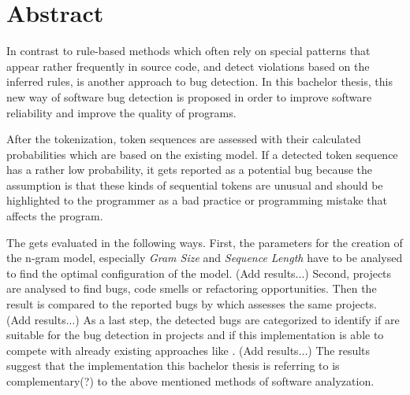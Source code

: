 \chapter*{Abstract}

In contrast to rule-based methods which often rely on special patterns that appear rather frequently in source code, and detect violations based on the inferred rules, \ngram{} is another approach to bug detection. In this bachelor thesis, this new way of software bug detection is proposed in order to improve software reliability and improve the quality of \scratch{} programs.

After the tokenization, token sequences are assessed with their calculated probabilities which are based on the existing model. If a detected token sequence has a rather low probability, it gets reported as a potential bug because the assumption is that these kinds of sequential tokens are unusual and should be highlighted to the programmer as a bad practice or programming mistake that affects the program.

The \ngram{} gets evaluated in the following ways. First, the parameters for the creation of the n-gram model, especially \emph{Gram Size} and \emph{Sequence Length} have to be analysed to find the optimal configuration of the model. (Add results...) Second, \scratch{} projects are analysed to find bugs, code smells or refactoring opportunities. Then the result is compared to the reported bugs by \litterbox{} which assesses the same projects. (Add results...) As a last step, the detected bugs are categorized to identify if  are suitable for the bug detection in \scratch{} projects and if this implementation is able to compete with already existing approaches like \litterbox{}. (Add results...) The results suggest that the implementation this bachelor thesis is referring to is complementary(?) to the above mentioned methods of software analyzation.
 